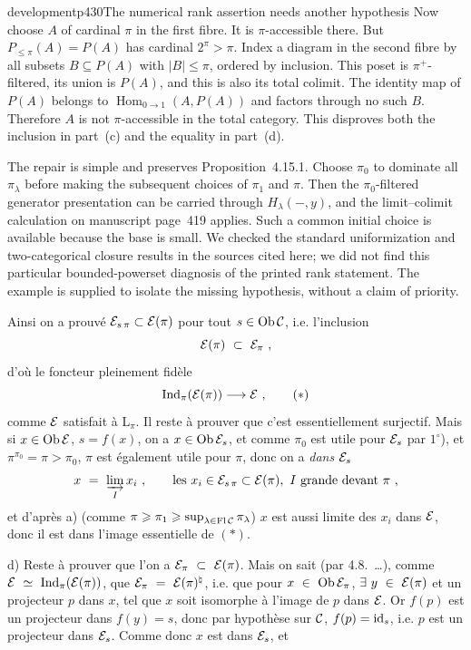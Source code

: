 \begin{dcomment}{development}{p430}{The numerical rank assertion needs another hypothesis}
Now choose $A$ of cardinal $\pi$ in the first fibre. It is $\pi$-accessible there. But $P_{\leq\pi}(A)=P(A)$ has cardinal $2^\pi>\pi$. Index a diagram in the second fibre by all subsets $B\subseteq P(A)$ with $|B|\leq\pi$, ordered by inclusion. This poset is $\pi^+$-filtered, its union is $P(A)$, and this is also its total colimit. The identity map of $P(A)$ belongs to $\operatorname{Hom}_{0\to1}(A,P(A))$ and factors through no such $B$. Therefore $A$ is not $\pi$-accessible in the total category. This disproves both the inclusion in part~(c) and the equality in part~(d).\par

The repair is simple and preserves Proposition~4.15.1. Choose $\pi_0$ to dominate all $\pi_\lambda$ before making the subsequent choices of $\pi_1$ and $\pi$. Then the $\pi_0$-filtered generator presentation can be carried through $H_\lambda(-,y)$, and the limit--colimit calculation on manuscript page~419 applies. Such a common initial choice is available because the base is small. We checked the standard uniformization and two-categorical closure results in the sources cited here; we did not find this particular bounded-powerset diagnosis of the printed rank statement. The example is supplied to isolate the missing hypothesis, without a claim of priority.
\end{dcomment}


Ainsi on a prouvé $\mathcal{E}_{s\,\pi} \subset \mathcal{E}(\pi)$ pour tout $s \in \operatorname{Ob} \mathcal{C}$, i.e. l'inclusion
\[
\cE(\pi) \ \subset \ \cE_{\pi} \ ,
\]
d'où le foncteur pleinement fidèle
\[
\Ind_{\pi}(\cE(\pi)) \longrightarrow \cE \ , \tag*{$(*)$}
\]
comme $\mathcal{E}$ satisfait à $\mathrm{L}_{\pi}$. Il reste à prouver que c'est essentiellement surjectif. Mais si $x \in \operatorname{Ob} \mathcal{E}$, $s = f(x)$, on a $x \in \operatorname{Ob} \mathcal{E}_s$, et comme $\pi_0$ est utile pour $\mathcal{E}_s$ par $1^{\circ}$), et $\pi^{\pi_0} = \pi > \pi_0$,
$\pi$ est également utile pour $\pi$, donc on a \textit{dans} $\mathcal{E}_s$ %
\[
x \ = \ \varinjlim_{I} x_i \ , \qquad \text{les } x_i \in \cE_{s\,\pi} \subset \cE(\pi),\ I \text{ grande devant } \pi \ ,
\]
et d'après a) (comme $\pi \geqslant \pi_1 \geqslant \sup_{\lambda \in \operatorname{Fl} \mathcal{C}} \pi_{\lambda}$) $x$ est aussi limite des $x_i$ dans $\mathcal{E}$, donc il est dans l'image essentielle de $(*)$.

d) Reste à prouver que l'on a $\cE_{\pi} \ \subset \ \cE(\pi)$. Mais on sait (par 4.8.~\dots), comme $\mathcal{E} \ \simeq \ \operatorname{Ind}_{\pi}(\mathcal{E}(\pi))$, que $\mathcal{E}_{\pi} \ = \ \mathcal{E}(\pi)^{\natural}$, i.e. que pour $x \ \in \ \operatorname{Ob} \mathcal{E}_{\pi}$, $\exists \ y \ \in \ \cE(\pi)$ et un projecteur $p$ dans $x$, tel que $x$ soit isomorphe à l'image de $p$ dans $\mathcal{E}$. Or $f(p)$ est un projecteur dans $f(y) = s$, donc par hypothèse sur $\mathcal{C}$, $f(p) = \mathrm{id}_s$, i.e. $p$ est un projecteur dans $\mathcal{E}_s$. Comme donc $x$ est dans $\mathcal{E}_s$, et

